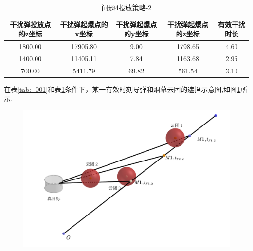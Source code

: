 \documentclass[../main.tex]{subfiles}
\begin{document}
\begin{table}[H]
\caption{问题4投放策略-2}
\label{tab:---031} 
\centering
\begin{small}
\begin{tabular}{ccccc}
\toprule[1.5pt]
    干扰弹投放点的z坐标 &干扰弹起爆点的x坐标&干扰弹起爆点的y坐标&干扰弹起爆点的z坐标&有效干扰时长\\
\midrule[1pt]
1800.00             & 17905.80                 & 9.00     & 1798.65                    & 4.60  \\               
1400.00             & 11405.11                 & 7.84     & 1163.68                    & 2.95  \\               
700.00              & 5411.79                  & 69.82    & 561.54                    & 3.10  \\                
\bottomrule[1.5pt]
\end{tabular}
\end{small}
\end{table}
在表\ref{tab:--001}和表\ref{tab:---031}条件下，某一有效时刻导弹和烟幕云团的遮挡示意图,如图\ref{图----3}所示.

\begin{figure}[H]
\centering
\includegraphics[scale=0.5]{图三.png}
\caption{}
\label{图----3}
\end{figure}
\end{document}
